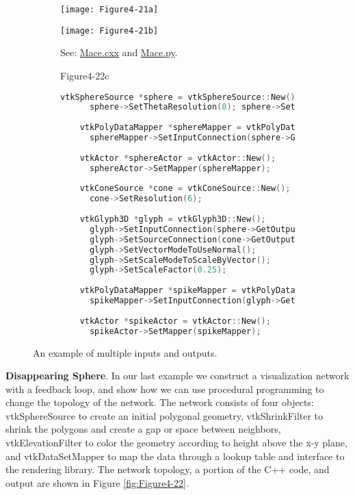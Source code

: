 \begin{figure}[htb]
  \begin{subfigure}[h]{0.64\linewidth}
    \texttt{[image: Figure4-21a]}
    \caption*{}
    \label{fig:Figure4-21a}
  \end{subfigure}
  \hfill
  \begin{subfigure}[h]{0.32\linewidth}
    \texttt{[image: Figure4-21b]}
    \caption*{See: \href{https://lorensen.github.io/VTKExamples/site/Cxx/Rendering/Mace/}{Mace.cxx} and \href{https://lorensen.github.io/VTKExamples/site/Python/Rendering/Mace/}{Mace.py}.}
    \label{fig:Figure4-21b}
  \end{subfigure}
  \hfill
  \begin{subfigure}[h]{0.96\linewidth}{Figure4-22c}
    \begin{lstlisting}[language=C++, caption={Warped Sphere.}]
    vtkSphereSource *sphere = vtkSphereSource::New();
      sphere->SetThetaResolution(8); sphere->SetPhiResolution(8);
    
    vtkPolyDataMapper *sphereMapper = vtkPolyDataMapper::New();
      sphereMapper->SetInputConnection(sphere->GetOutputPort());
    
    vtkActor *sphereActor = vtkActor::New();
      sphereActor->SetMapper(sphereMapper);
    
    vtkConeSource *cone = vtkConeSource::New();
      cone->SetResolution(6);
    
    vtkGlyph3D *glyph = vtkGlyph3D::New();
      glyph->SetInputConnection(sphere->GetOutputPort());
      glyph->SetSourceConnection(cone->GetOutputPort());
      glyph->SetVectorModeToUseNormal();
      glyph->SetScaleModeToScaleByVector();
      glyph->SetScaleFactor(0.25);
    
    vtkPolyDataMapper *spikeMapper = vtkPolyDataMapper::New();
      spikeMapper->SetInputConnection(glyph->GetOutputPort());
    
    vtkActor *spikeActor = vtkActor::New();
      spikeActor->SetMapper(spikeMapper);
    \end{lstlisting}
    \caption*{}
  \end{subfigure}
  \caption{An example of multiple inputs and outputs.}\label{fig:Figure4-21}
\end{figure}

\textbf{Disappearing Sphere}. In our last example we construct a visualization network with a feedback loop, and show how we can use procedural programming to change the topology of the network. The network consists of four objects: vtkSphereSource to create an initial polygonal geometry, vtkShrinkFilter to shrink the polygons and create a gap or space between neighbors, vtkElevationFilter to color the geometry according to height above the x-y plane, and vtkDataSetMapper to map the data through a lookup table and interface to the rendering library. The network topology, a portion of the C++ code, and output are shown in Figure \ref{fig:Figure4-22}.

